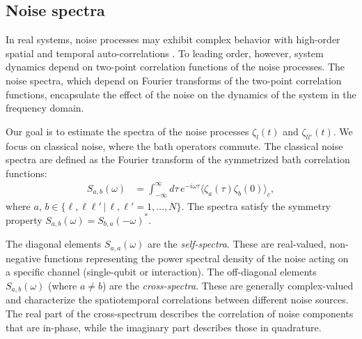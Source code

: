 \documentclass[%
 reprint,
superscriptaddress,
 amsmath,amssymb,
 aps,
pra,
]{revtex4-2}
\begin{document}
\subsection{Noise spectra}
In real systems, noise processes may exhibit complex behavior with high-order spatial and temporal auto-correlations \cite{Ramon,Sung2019}. To leading order, however, system dynamics depend on two-point correlation functions of the noise processes. The noise spectra, which depend on Fourier transforms of the two-point correlation functions, encapsulate the effect of the noise on the dynamics of the system in the frequency domain.

Our goal is to estimate the spectra of the noise processes $\zeta_l(t)$ and $\zeta_{ll'}(t)$. We focus on classical noise, where the bath operators commute. The classical noise spectra are defined as the Fourier transform of the symmetrized bath correlation functions:
\begin{align}
    S_{a,b}(\omega) &= \int_{-\infty}^\infty d\tau\, e^{-i\omega\tau}\langle \zeta_a(\tau)\zeta_b(0)\rangle_{c},
\end{align}
where $a,\,b\in\{\ell,\ell\ell'\,|\,\ell,\ell'=1,\ldots,N\}$. The spectra satisfy the symmetry property $S_{a,b}(\omega) = S_{b,a}(-\omega)^*$.

The diagonal elements $S_{a,a}(\omega)$ are the \textit{self-spectra}. These are real-valued, non-negative functions representing the power spectral density of the noise acting on a specific channel (single-qubit or interaction). The off-diagonal elements $S_{a,b}(\omega)$ (where $a \neq b$) are the \textit{cross-spectra}. These are generally complex-valued and characterize the spatiotemporal correlations between different noise sources. The real part of the cross-spectrum describes the correlation of noise components that are in-phase, while the imaginary part describes those in quadrature.
\end{document}
